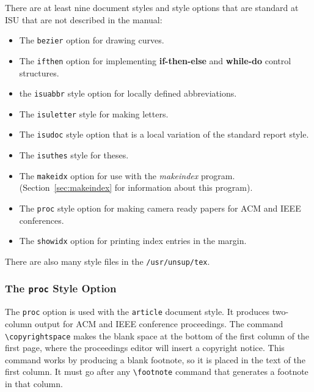 There are at least nine document styles and style options
that are standard at ISU that
are not described in the manual: 
\begin{itemize}
\item The {\tt bezier} option for drawing curves.

\item The {\tt ifthen} option for implementing {\bf if-then-else} and
{\bf while-do} control structures.

\item the \mbox{\tt isuabbr} style option for
locally defined abbreviations.

\item The \mbox{\tt isuletter} style for making letters.

\item The {\tt isudoc} style option that is a local variation of the
standard report style.

\item The {\tt isuthes} style for theses.

\item The {\tt makeidx} option for use with the {\it makeindex\/}
program. (Section~\ref{sec:makeindex} for information about this
program).

\item The {\tt proc} style option for making camera ready papers
for ACM and IEEE conferences.

\item The {\tt showidx} option for printing index entries in the
margin.  
\end{itemize} 

There are also many style files in the {\tt /usr/unsup/tex}.

\subsubsection{The {\tt proc} Style Option}

The {\tt proc} option is used with the \mbox{\tt article} document
style.  It produces two-column output for ACM and IEEE conference
proceedings.  The command \hbox{\verb|\copyrightspace|} makes the blank
space at the bottom of the first column of the first page, where the
proceedings editor will insert a copyright notice.  This command works
by producing a blank footnote, so it is placed in the text of the first
column.  It must go after any \hbox{\verb|\footnote|} command that
generates a footnote in that column.


